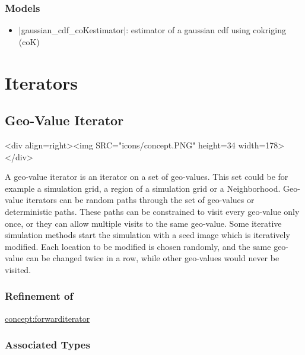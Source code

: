 \documentclass[12pt,twoside]{report}
\begin{document}
\htmlrule[CLEAR=all]  \subsubsection*{Models}
\begin{itemize}
\item |gaussian_cdf_coKestimator|: estimator of a gaussian cdf using cokriging (coK)
\end{itemize}










\section{Iterators}
\label{iterators}

% 
\subsection{Geo-Value Iterator}
\label{concept:gviterator}
\begin{htmlonly}
<div align=right><img SRC="icons/concept.PNG" height=34 width=178></div>
\end{htmlonly}

A geo-value iterator is an iterator on a set of geo-values. This set could be for example a simulation grid, a region of a simulation grid or a Neighborhood. Geo-value iterators can be random paths through the set of geo-values or deterministic paths. These paths can be constrained to visit every geo-value only once, or they can allow  multiple visits to the same geo-value. Some iterative simulation methods start the simulation with a seed image which is iteratively modified. Each location to be modified is chosen randomly, and the same geo-value can be changed twice in a row, while other geo-values would never be visited. 


\htmlrule[CLEAR=all]  \subsubsection*{Refinement of}
\hyperref{Forward Iterator}{Forward Iterator (see Section}{)}{concept:forwarditerator}

\htmlrule[CLEAR=all]  \subsubsection*{Associated Types}
\end{document}

